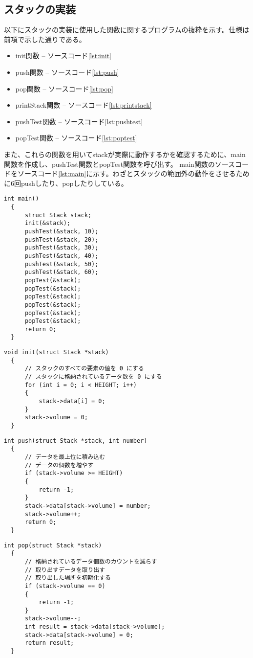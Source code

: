 \documentclass[a4paper,11pt]{jsarticle}
\begin{document}
\subsection{スタックの実装}
以下にスタックの実装に使用した関数に関するプログラムの抜粋を示す。仕様は前項で示した通りである。
\begin{itemize}
  \item init関数 --  ソースコード\ref{lst:init}
  \item push関数 --  ソースコード\ref{lst:push}
  \item pop関数 --  ソースコード\ref{lst:pop}
  \item printStack関数 --  ソースコード\ref{lst:printstack}
  \item pushTest関数 --  ソースコード\ref{lst:pushtest}
  \item popTest関数 --  ソースコード\ref{lst:poptest}
\end{itemize}
また、これらの関数を用いてstackが実際に動作するかを確認するために、main関数を作成し、pushTest関数とpopTest関数を呼び出す。
main関数のソースコードをソースコード\ref{lst:main}に示す。わざとスタックの範囲外の動作をさせるために6回pushしたり、popしたりしている。
\begin{lstlisting}[caption={main関数}, label={lst:main}]
  int main()
  {
      struct Stack stack;
      init(&stack);
      pushTest(&stack, 10);
      pushTest(&stack, 20);
      pushTest(&stack, 30);
      pushTest(&stack, 40);
      pushTest(&stack, 50);
      pushTest(&stack, 60);
      popTest(&stack);
      popTest(&stack);
      popTest(&stack);
      popTest(&stack);
      popTest(&stack);
      popTest(&stack);
      return 0;
  }
\end{lstlisting}
\begin{lstlisting}[caption={init関数}, label={lst:init}]
  void init(struct Stack *stack)
  {
      // スタックのすべての要素の値を 0 にする
      // スタックに格納されているデータ数を 0 にする
      for (int i = 0; i < HEIGHT; i++)
      {
          stack->data[i] = 0;
      }
      stack->volume = 0;
  }
\end{lstlisting}
\begin{lstlisting}[caption={push関数}, label={lst:push}]
  int push(struct Stack *stack, int number)
  {
      // データを最上位に積み込む
      // データの個数を増やす
      if (stack->volume >= HEIGHT)
      {
          return -1;
      }
      stack->data[stack->volume] = number;
      stack->volume++;
      return 0;
  }
\end{lstlisting}
\begin{lstlisting}[caption={pop関数}, label={lst:pop}]
  int pop(struct Stack *stack)
  {
      // 格納されているデータ個数のカウントを減らす
      // 取り出すデータを取り出す
      // 取り出した場所を初期化する
      if (stack->volume == 0)
      {
          return -1;
      }
      stack->volume--;
      int result = stack->data[stack->volume];
      stack->data[stack->volume] = 0;
      return result;
  }
\end{lstlisting}
\end{document}

